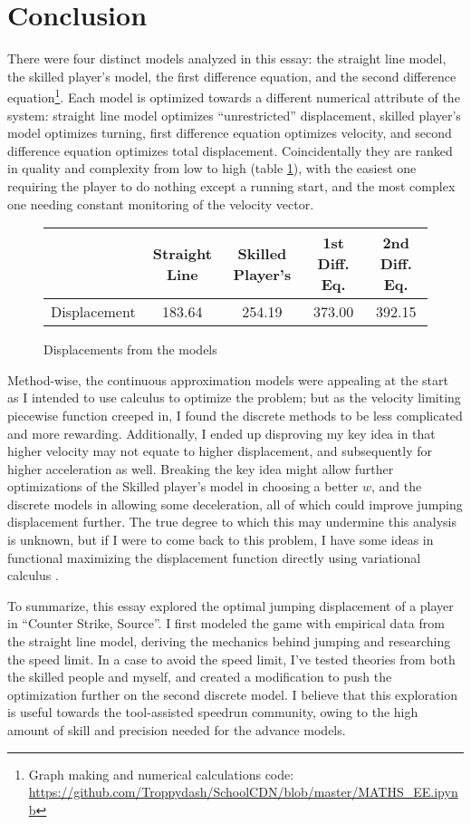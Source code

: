 

\section{Conclusion}
There were four distinct models analyzed in this essay: the straight line model, the skilled player's model, the first difference equation, and the second difference equation\footnote{Graph making and numerical calculations code: \url{https://github.com/Troppydash/SchoolCDN/blob/master/MATHS_EE.ipynb}}. Each model is optimized towards a different numerical attribute of the system: straight line model optimizes ``unrestricted'' displacement, skilled player's model optimizes turning, first difference equation optimizes velocity, and second difference equation optimizes total displacement. Coincidentally they are ranked in quality and complexity from low to high (table \ref{tbl:dis}), with the easiest one requiring the player to do nothing except a running start, and the most complex one needing constant monitoring of the velocity vector.

\begin{figure}[H]
    \centering
    \begin{tabular}{|c|c|c|c|c|}
        \hline
        & Straight Line & Skilled Player's & 1st Diff. Eq. & 2nd Diff. Eq.\\
        \hline
        Displacement & 183.64  & 254.19 & 373.00 & 392.15 \\
        \hline
    \end{tabular}
    \caption{Displacements from the models}
    \label{tbl:dis}
\end{figure}

Method-wise, the continuous approximation models were appealing at the start as I intended to use calculus to optimize the problem; but as the velocity limiting piecewise function creeped in, I found the discrete methods to be less complicated and more rewarding. Additionally, I ended up disproving my key idea in that higher velocity may not equate to higher displacement, and subsequently for higher acceleration as well. Breaking the key idea might allow further optimizations of the Skilled player's model in choosing a better $w$, and the discrete models in allowing some deceleration, all of which could improve jumping displacement further. The true degree to which this may undermine this analysis is unknown, but if I were to come back to this problem, I have some ideas in functional maximizing the displacement function directly using variational calculus .

To summarize, this essay explored the optimal jumping displacement of a player in ``Counter Strike, Source''. I first modeled the game with empirical data from the straight line model, deriving the mechanics behind jumping and researching the speed limit. In a case to avoid the speed limit, I've tested theories from both the skilled people and myself, and created a modification to push the optimization further on the second discrete model. I believe that this exploration is useful towards the tool-assisted speedrun community, owing to the high amount of skill and precision needed for the advance models.

